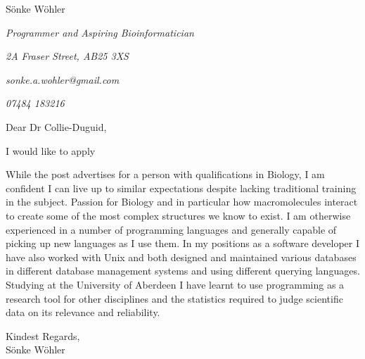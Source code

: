 \documentclass[paper=a4,fontsize=11pt]{scrartcl} %
\newcommand{\sepspace}{\vspace*{1em}}		%
\newcommand{\MyName}[1]{ %
  \Huge \usefont{OT1}{phv}{b}{n} \hfill #1
  \par \normalsize \normalfont}
\newcommand{\MySlogan}[4]{ %
  \large \usefont{OT1}{phv}{m}{n}\hfill \textit{#1} 
  \sepspace
  \par \normalsize \usefont{OT1}{phv}{m}{n}\hfill \textit{#2}
  \par \normalsize \usefont{OT1}{phv}{m}{n}\hfill \textit{#3}
  \par \normalsize \usefont{OT1}{phv}{m}{n}\hfill \textit{#4}
  \par \normalsize \normalfont}
\begin{document}
  
  \MyName{S\"onke W\"ohler}
  \MySlogan{Programmer and Aspiring Bioinformatician}{2A Fraser Street, AB25 3XS}{sonke.a.wohler@gmail.com}{07484 183216}
  
  \noindent
  Dear Dr  Collie-Duguid,
    
  \sepspace
  
    \noindent
    I would like to apply 
    \sepspace
    
    \noindent
    While the post advertises for a person with qualifications in Biology, I am confident I can live up to similar expectations despite lacking traditional training in the subject. Passion for Biology and in particular how macromolecules interact to create some of the most complex structures we know to exist. I am otherwise experienced in a number of programming languages and generally capable of picking up new languages as I use them. In my positions as a software developer I have also worked with Unix and both designed and maintained various databases in different database management systems and using different querying languages. Studying at the University of Aberdeen I have learnt to use programming as a research tool for other disciplines and the statistics required to judge scientific data on its relevance and reliability.
    \sepspace
    
    \noindent
    
    \sepspace
    

  \sepspace
  
  \noindent
  Kindest Regards, \\
  S\"onke W\"ohler
  
\end{document}

